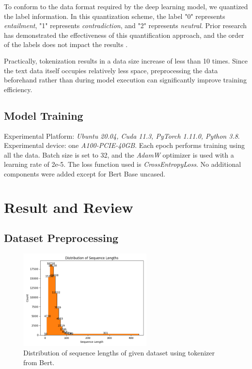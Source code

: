 \documentclass[11pt]{article}
\begin{document}
To conform to the data format required by the deep learning model, we quantized the label information. In this quantization scheme, the label "0" represents \textit{entailment}, "1" represents \textit{contradiction}, and "2" represents \textit{neutral}. Prior research has demonstrated the effectiveness of this quantification approach, and the order of the labels does not impact the results \cite{chen2015convolutional}.

Practically, tokenization results in a data size increase of less than 10 times. Since the text data itself occupies relatively less space, preprocessing the data beforehand rather than during model execution can significantly improve training efficiency.


\subsection{Model Training}

Experimental Platform: \textit{Ubuntu 20.04, Cuda 11.3, PyTorch 1.11.0, Python 3.8}. Experimental device: one \textit{A100-PCIE-40GB}. Each epoch performs training using all the data. Batch size is set to 32, and the \textit{AdamW} optimizer is used with a learning rate of 2e-5. The loss function used is \textit{CrossEntropyLoss}. No additional components were added except for Bert Base uncased.

\section{Result and Review}

\subsection{Dataset Preprocessing}

\begin{figure}[t]
  \centering
  \includegraphics[width=0.6\textwidth]{distribution.png}
  \caption{Distribution of sequence lengths of given dataset using tokenizer from Bert.}
  \label{fig:image_label}
\end{figure}
\end{document}
